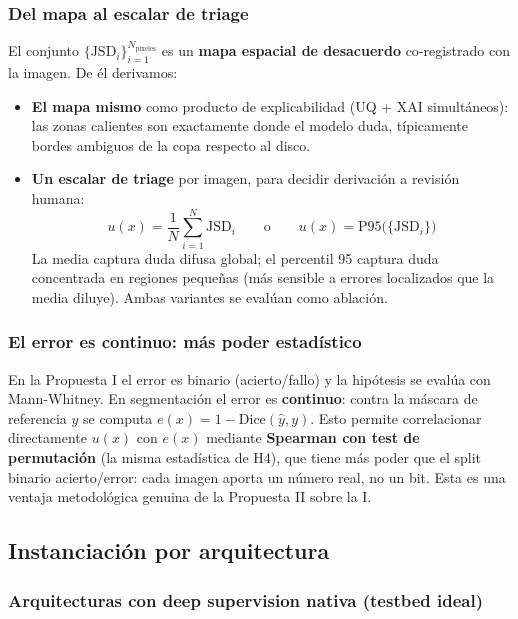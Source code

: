 \documentclass[12pt,a4paper]{article}
\newcommand{\JSD}{\mathrm{JSD}}
\begin{document}
\subsubsection{Del mapa al escalar de triage}

El conjunto $\{\JSD_i\}_{i=1}^{N_{\text{píxeles}}}$ es un \textbf{mapa espacial de desacuerdo} co-registrado con la imagen.
De él derivamos:

\begin{itemize}
    \item \textbf{El mapa mismo} como producto de explicabilidad (UQ + XAI simultáneos): las zonas calientes son exactamente donde el modelo duda, típicamente bordes ambiguos de la copa respecto al disco.
    \item \textbf{Un escalar de triage} por imagen, para decidir derivación a revisión humana:
    \begin{equation}
    u(x) = \frac{1}{N}\sum_{i=1}^{N} \JSD_i
    \qquad \text{o} \qquad
    u(x) = \mathrm{P95}\big(\{\JSD_i\}\big)
    \end{equation}
    La media captura duda difusa global; el percentil 95 captura duda concentrada en regiones pequeñas (más sensible a errores localizados que la media diluye).
    Ambas variantes se evalúan como ablación.
\end{itemize}

\subsubsection{El error es continuo: más poder estadístico}

En la Propuesta I el error es binario (acierto/fallo) y la hipótesis se evalúa con Mann-Whitney.
En segmentación el error es \textbf{continuo}: contra la máscara de referencia $y$ se computa $e(x) = 1 - \mathrm{Dice}(\hat{y}, y)$.
Esto permite correlacionar directamente $u(x)$ con $e(x)$ mediante \textbf{Spearman con test de permutación} (la misma estadística de H4), que tiene más poder que el split binario acierto/error: cada imagen aporta un número real, no un bit.
Esta es una ventaja metodológica genuina de la Propuesta II sobre la I.

\subsection{Instanciación por arquitectura}

\subsubsection{Arquitecturas con deep supervision nativa (testbed ideal)}
\end{document}
